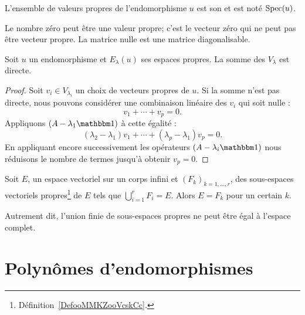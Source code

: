 \begin{definition}
    L'ensemble de valeurs propres de l'endomorphisme \( u\) est son  et est noté \( \operatorname{Spec}(u)\).
\end{definition}

\begin{remark}
    Le nombre zéro peut être une valeur propre; c'est le vecteur zéro qui ne peut pas être vecteur propre. La matrice nulle est une matrice diagonalisable.
\end{remark}

\begin{lemma}       \label{LemjcztYH}
    Soit \( u\) un endomorphisme et \( E_{\lambda}(u)\) ses espaces propres. La somme des \( V_{\lambda}\) est directe.
\end{lemma}

\begin{proof}
    Soit \( v_i\in V_{\lambda_i}\) un choix de vecteurs propres de \( u\). Si la somme n'est pas directe, nous pouvons considérer une combinaison linéaire des \( v_i\) qui soit nulle :
    \begin{equation}
        v_1+\cdots+v_p=0.
    \end{equation}
    Appliquons \( (A-\lambda_1\mtu)\) à cette égalité :
    \begin{equation}
        (\lambda_2-\lambda_1)v_1+\cdots+(\lambda_p-\lambda_1)v_p=0.
    \end{equation}
    En appliquant encore successivement les opérateurs \( (A-\lambda_i\mtu)\) nous réduisons le nombre de termes jusqu'à obtenir \( v_p=0\).
\end{proof}

\begin{proposition}   \label{PropTVKbxU}
    Soit \( E\), un espace vectoriel sur un corps infini et \( (F_k)_{k=1,\ldots, r}\), des sous-espaces vectoriels propres\footnote{Définition~\ref{DefooMMKZooVcskCc}.} de \( E\) tels que \( \bigcup_{i=1}^rF_i=E\). Alors \( E=F_k\) pour un certain \( k\).

    Autrement dit, l'union finie de sous-espaces propres ne peut être égal à l'espace complet.
\end{proposition}

\section{Polynômes d'endomorphismes}
\label{SECooUEQVooLBrRiE}

